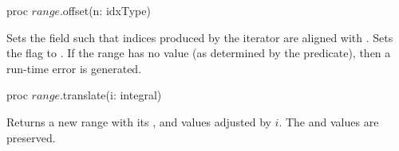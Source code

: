 \begin{protohead}
proc $range$.offset(n: idxType)
\end{protohead}
\label{Range_Offset_Method}
\begin{protobody}
Sets the  field such that indices produced by the iterator are
aligned with .  Sets the  flag to .  
If the range has no  value (as determined
by the  predicate), then a run-time error is generated.
\end{protobody}

\begin{protohead}
proc $range$.translate(i: integral)
\end{protohead}
\begin{protobody}
Returns a new range with its ,  and  values
adjusted by $i$.  The  and  values are preserved.
\end{protobody}

\begin{protohead}
\end{protohead}
\begin{protobody}
\end{protobody}

